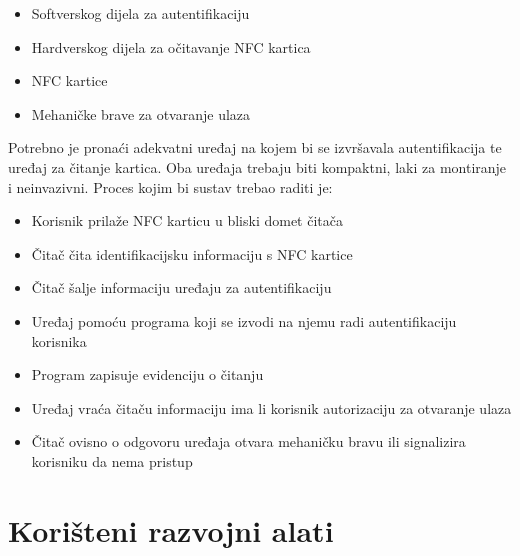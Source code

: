 \documentclass[times, utf8, zavrsni]{fer}
\begin{document}
\begin{itemize}
\item Softverskog dijela za autentifikaciju
\item Hardverskog dijela za očitavanje NFC kartica
\item NFC kartice 
\item Mehaničke brave za otvaranje ulaza
\end{itemize}
Potrebno je pronaći adekvatni uređaj na kojem bi se izvršavala autentifikacija te uređaj za čitanje kartica. Oba uređaja trebaju biti kompaktni, laki za montiranje i neinvazivni.
\newline
Proces kojim bi sustav trebao raditi je:

\begin{itemize}
\item Korisnik prilaže NFC karticu u bliski domet čitača
\item Čitač čita identifikacijsku informaciju s NFC kartice
\item Čitač šalje informaciju uređaju za autentifikaciju
\item Uređaj pomoću programa koji se izvodi na njemu radi autentifikaciju korisnika
\item Program zapisuje evidenciju o čitanju
\item Uređaj vraća čitaču informaciju ima li korisnik autorizaciju za otvaranje ulaza
\item Čitač ovisno o odgovoru uređaja otvara mehaničku bravu ili signalizira korisniku da nema pristup
\end{itemize}

\section{Korišteni razvojni alati}
\end{document}

